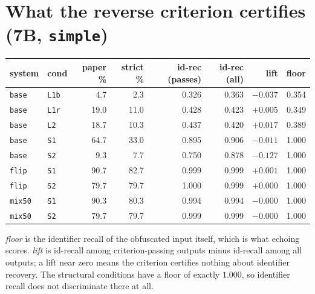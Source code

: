 \documentclass{article}
\newcommand{\arm}[1]{\texttt{#1}}
\begin{document}
\section{What the reverse criterion certifies (7B, \texttt{simple})}
\label{app:e8}
\begin{center}\small
\begin{tabular}{llrrrrrr}
\toprule
system & cond & paper \% & strict \% & id-rec (passes) & id-rec (all) & \textbf{lift} & floor \\
\midrule
\arm{base} & \arm{L1b} & 4.7 & 2.3 & 0.326 & 0.363 & $-0.037$ & 0.354 \\
\arm{base} & \arm{L1r} & 19.0 & 11.0 & 0.428 & 0.423 & $+0.005$ & 0.349 \\
\arm{base} & \arm{L2}  & 18.7 & 10.3 & 0.437 & 0.420 & $+0.017$ & 0.389 \\
\arm{base} & \arm{S1}  & 64.7 & 33.0 & 0.895 & 0.906 & $-0.011$ & 1.000 \\
\arm{base} & \arm{S2}  & 9.3 & 7.7 & 0.750 & 0.878 & $-0.127$ & 1.000 \\
\midrule
\arm{flip} & \arm{S1}  & 90.7 & 82.7 & 0.999 & 0.999 & $+0.001$ & 1.000 \\
\arm{flip} & \arm{S2}  & 79.7 & 79.7 & 1.000 & 0.999 & $+0.000$ & 1.000 \\
\arm{mix50} & \arm{S1} & 90.3 & 80.3 & 0.994 & 0.994 & $-0.000$ & 1.000 \\
\arm{mix50} & \arm{S2} & 79.7 & 79.7 & 0.999 & 0.999 & $-0.000$ & 1.000 \\
\bottomrule
\end{tabular}
\end{center}
\emph{floor} is the identifier recall of the obfuscated input itself, which is what echoing
scores.
\emph{lift} is id-recall among criterion-passing outputs minus id-recall among all outputs;
a lift near zero means the criterion certifies nothing about identifier recovery. The
structural conditions have a floor of exactly $1.000$, so identifier recall does not
discriminate there at all.
\end{document}
